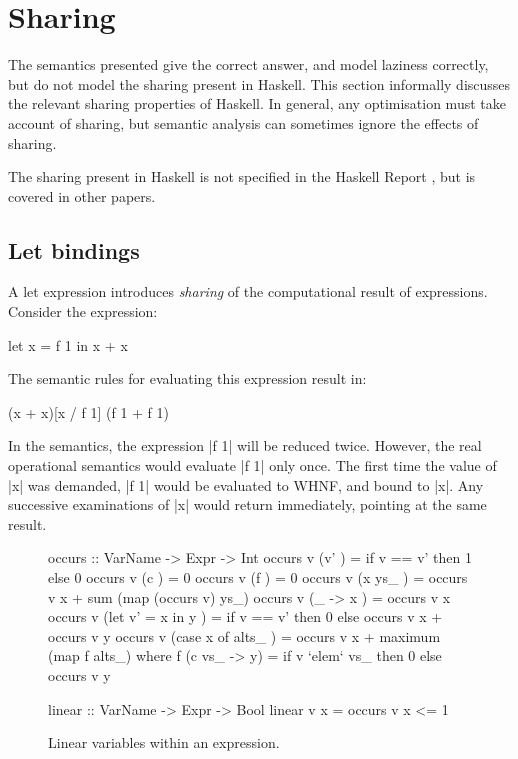 \section{Sharing}
\label{sec:sharing}

The semantics presented give the correct answer, and model laziness correctly, but do not model the sharing present in Haskell. This section informally discusses the relevant sharing properties of Haskell. In general, any optimisation must take account of sharing, but semantic analysis can sometimes ignore the effects of sharing.

The sharing present in Haskell is not specified in the Haskell Report \cite{haskell}, but is covered in other papers.

\subsection{Let bindings}

A let expression introduces \textit{sharing} of the computational result of expressions. Consider the expression:

\begin{example}
\begin{code}
let x = f 1
in x + x
\end{code}

The semantic rules for evaluating this expression result in:

\begin{code}
(x + x)[x / f 1]
(f 1 + f 1)
\end{code}

In the semantics, the expression |f 1| will be reduced twice. However, the real operational semantics would evaluate |f 1| only once. The first time the value of |x| was demanded, |f 1| would be evaluated to WHNF, and bound to |x|. Any successive examinations of |x| would return immediately, pointing at the same result.
\end{example}

\begin{figure}
\begin{code}
occurs :: VarName -> Expr -> Int
occurs v (v'                ) = if v == v' then 1 else 0
occurs v (c                 ) = 0
occurs v (f                 ) = 0
occurs v (x ys_             ) = occurs v x + sum (map (occurs v) ys_)
occurs v (\vs_ -> x         ) = occurs v x
occurs v (let v' = x in y   ) = if v == v' then 0 else occurs v x + occurs v y
occurs v (case x of alts_   ) = occurs v x + maximum (map f alts_)
    where f (c vs_ -> y) = if v `elem` vs_ then 0 else occurs v y

linear :: VarName -> Expr -> Bool
linear v x = occurs v x <= 1
\end{code}
\caption{Linear variables within an expression.}
\label{fig:linear}
\end{figure}

